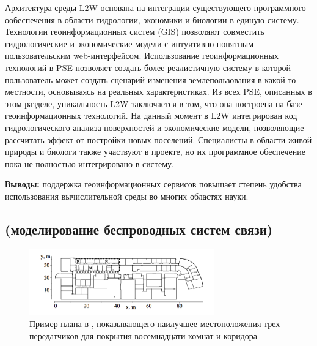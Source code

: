 Архитектура среды L2W основана на интеграции существующего программного ообеспечения в области гидрологии, экономики и биологии в единую систему. Технологии геоинформационных систем (GIS) позволяют совместить гидрологические и экономические модели с интуитивно понятным пользовательским web-интерфейсом. Использование геоинформационных технологий в PSE позволяет создать более реалистичную систему в которой пользователь может создать сценарий изменения землепользования в какой-то местности, основываясь на реальных характеристиках. Из всех PSE, описанных в этом разделе, уникальность L2W заключается в том, что она построена на базе геоинформационных технологий. На данный момент в L2W интегрирован код гидрологического анализа поверхностей и экономические модели, позволяющие рассчитать эффект от постройки новых поселений. Специалисты в области живой природы и биологи также участвуют в проекте, но их программное обеспечение пока не полностью интегрировано в систему.

\textbf{Выводы:} поддержка геоинформационных сервисов повышает степень удобства использования вычислительной среды во многих областях науки.

\subsection{\SW (моделирование беспроводных систем связи)}
\begin{figure}
  \centering
    \includegraphics[width=8cm]{images/s4w-screenshot.png}
  \caption{Пример плана в \SW, показывающего наилучшее местоположения трех передатчиков для покрытия восемнадцати комнат и коридора}
  \label{fig:s4w-screenshot}
\end{figure}      

